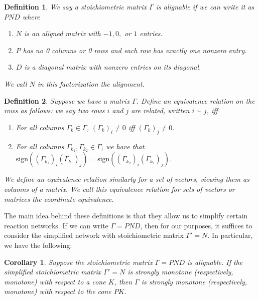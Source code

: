 \documentclass{article}
\newtheorem{cor}{Corollary}
\newtheorem{define}{Definition}
\begin{document}
\begin{define}
    We say a stoichiometric matrix $\Gamma$ is \textit{alignable} if we can write it as $PND$ where 

    \begin{enumerate}
        \item $N$ is an aligned matrix with $-1,0,$ or $1$ entries.
        \item $P$ has no 0 columns or 0 rows and each row has exactly one nonzero entry.
        \item $D$ is a diagonal matrix with nonzero entries on its diagonal.
    \end{enumerate}
    
    
    
     We call $N$ in this factorization the \textit{alignment}.
\end{define}


\begin{define}
\label{def:equivalence for rows}
    Suppose we have a matrix $\Gamma$. Define an equivalence relation on the rows as follows: we say two rows $i$ and $j$ are related, written $i \sim j$, iff 

    \begin{enumerate}
        \item For all columns $\Gamma_k \in \Gamma$, $(\Gamma_k)_i \neq 0$ iff $(\Gamma_k)_j \neq 0$.
        \item For all columns $\Gamma_{k_1}, \Gamma_{k_2} \in \Gamma$, we have that $\mbox{sign} ((\Gamma_{k_1})_i(\Gamma_{k_1})_j) = \mbox{sign} ((\Gamma_{k_2})_i(\Gamma_{k_2})_j)$.
    \end{enumerate}
    
    
    We define an equivalence relation similarly for a set of vectors, viewing them as columns of a matrix. We call this equivalence relation for sets of vectors or matrices the \textit{coordinate equivalence}.
\end{define}



The main idea behind these definitions is that they allow us to simplify certain reaction networks. If we can write \( \Gamma = PND \), then for our purposes, it suffices to consider the simplified network with stoichiometric matrix \( \Gamma' = N \). In particular, we have the following:

\begin{cor}
\label{cor:align to general}
Suppose the stoichiometric matrix \( \Gamma = PND \) is alignable. If the simplified stoichiometric matrix \( \Gamma' = N \) is strongly monotone (respectively, monotone) with respect to a cone \( K \), then \( \Gamma \) is strongly monotone (respectively, monotone) with respect to the cone \( PK \).
\end{cor}
\end{document}
